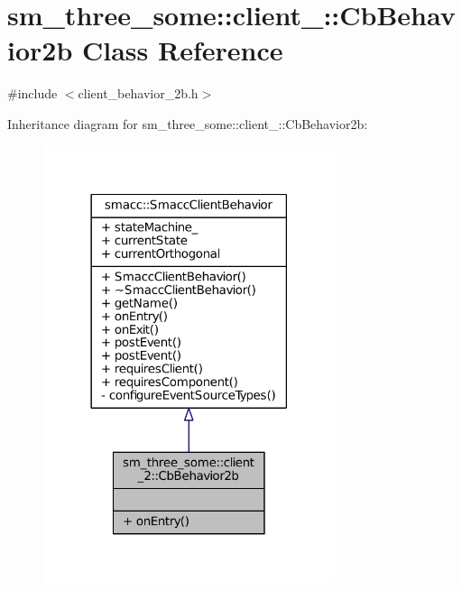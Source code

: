 \hypertarget{classsm__three__some_1_1client__2_1_1CbBehavior2b}{}\section{sm\+\_\+three\+\_\+some\+:\+:client\+\_\+:\+:Cb\+Behavior2b Class Reference}
\label{classsm__three__some_1_1client__2_1_1CbBehavior2b}


{\ttfamily \#include $<$client\+\_\+behavior\+\_\+2b.\+h$>$}



Inheritance diagram for sm\+\_\+three\+\_\+some\+:\+:client\+\_\+:\+:Cb\+Behavior2b\+:
\nopagebreak
\begin{figure}[H]
\begin{center}
\leavevmode
\includegraphics[width=242pt]{classsm__three__some_1_1client__2_1_1CbBehavior2b__inherit__graph}
\end{center}
\end{figure}


